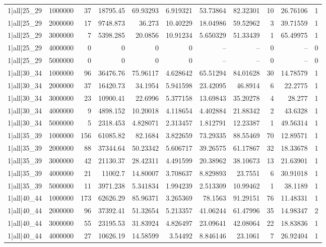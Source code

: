 \begin{tabular}{lrrrrrrrrrr}
1|all|25\_29 & 1000000 & 37 & 18795.45 & 69.93293 & 6.919321 & 53.73864 & 82.32301 & 10 & 26.76106 & 1 \\
1|all|25\_29 & 2000000 & 17 & 9748.873 & 36.273 & 10.40229 & 18.04986 & 59.52962 & 3 & 39.71559 & 1 \\
1|all|25\_29 & 3000000 & 7 & 5398.285 & 20.0856 & 10.91234 & 5.650329 & 51.33439 & 1 & 65.49975 & 1 \\
1|all|25\_29 & 4000000 & 0 & 0 & 0 & 0 & -- & -- & 0 & -- & 0 \\
1|all|25\_29 & 5000000 & 0 & 0 & 0 & 0 & -- & -- & 0 & -- & 0 \\
1|all|30\_34 & 1000000 & 96 & 36476.76 & 75.96117 & 4.628642 & 65.51294 & 84.01628 & 30 & 14.78579 & 1 \\
1|all|30\_34 & 2000000 & 37 & 16420.73 & 34.1954 & 5.941598 & 23.42095 & 46.8914 & 6 & 22.2775 & 1 \\
1|all|30\_34 & 3000000 & 23 & 10900.41 & 22.6996 & 5.377158 & 13.69843 & 35.20278 & 4 & 28.277 & 1 \\
1|all|30\_34 & 4000000 & 9 & 4898.152 & 10.20018 & 4.118654 & 4.402884 & 21.88342 & 2 & 43.6328 & 1 \\
1|all|30\_34 & 5000000 & 5 & 2318.453 & 4.828071 & 2.313457 & 1.812791 & 12.23387 & 1 & 49.56314 & 1 \\
1|all|35\_39 & 1000000 & 156 & 61085.82 & 82.1684 & 3.822659 & 73.29335 & 88.55469 & 70 & 12.89571 & 1 \\
1|all|35\_39 & 2000000 & 88 & 37344.64 & 50.23342 & 5.606717 & 39.26575 & 61.17867 & 32 & 18.33678 & 1 \\
1|all|35\_39 & 3000000 & 42 & 21130.37 & 28.42311 & 4.491599 & 20.38962 & 38.10673 & 13 & 21.63901 & 1 \\
1|all|35\_39 & 4000000 & 21 & 11002.7 & 14.80007 & 3.708637 & 8.829893 & 23.7551 & 6 & 30.91018 & 1 \\
1|all|35\_39 & 5000000 & 11 & 3971.238 & 5.341834 & 1.994239 & 2.513309 & 10.99462 & 1 & 38.1189 & 1 \\
1|all|40\_44 & 1000000 & 173 & 62626.29 & 85.96371 & 3.265369 & 78.1563 & 91.29151 & 76 & 11.48331 & 1 \\
1|all|40\_44 & 2000000 & 96 & 37392.41 & 51.32654 & 5.213357 & 41.06244 & 61.47996 & 35 & 14.98347 & 2 \\
1|all|40\_44 & 3000000 & 55 & 23195.53 & 31.83924 & 4.826497 & 23.09641 & 42.08064 & 22 & 18.83836 & 1 \\
1|all|40\_44 & 4000000 & 27 & 10626.19 & 14.58599 & 3.54492 & 8.846146 & 23.1061 & 7 & 26.92404 & 1 \\

\end{tabular}
